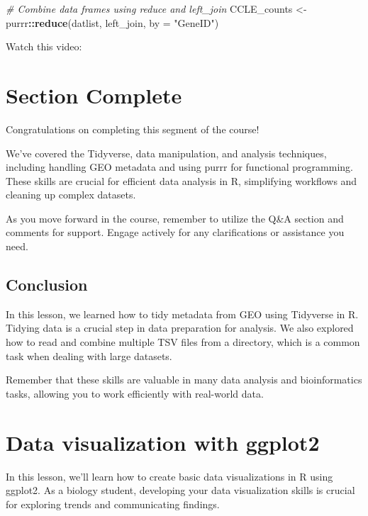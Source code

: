 \documentclass[
]{book}
\newenvironment{Shaded}{\begin{snugshade}}{\end{snugshade}}
\newcommand{\AttributeTok}[1]{\textcolor[rgb]{0.13,0.29,0.53}{#1}}
\newcommand{\CommentTok}[1]{\textcolor[rgb]{0.56,0.35,0.01}{\textit{#1}}}
\newcommand{\FunctionTok}[1]{\textcolor[rgb]{0.13,0.29,0.53}{\textbf{#1}}}
\newcommand{\NormalTok}[1]{#1}
\newcommand{\OtherTok}[1]{\textcolor[rgb]{0.56,0.35,0.01}{#1}}
\newcommand{\SpecialCharTok}[1]{\textcolor[rgb]{0.81,0.36,0.00}{\textbf{#1}}}
\newcommand{\StringTok}[1]{\textcolor[rgb]{0.31,0.60,0.02}{#1}}
\begin{document}
\begin{Shaded}
\begin{Highlighting}[]
\CommentTok{\# Combine data frames using reduce and left\_join}
\NormalTok{CCLE\_counts }\OtherTok{\textless{}{-}}\NormalTok{ purrr}\SpecialCharTok{::}\FunctionTok{reduce}\NormalTok{(datlist, left\_join, }\AttributeTok{by =} \StringTok{"GeneID"}\NormalTok{)}
\end{Highlighting}
\end{Shaded}

Watch this video:

\hypertarget{section-complete-3}{%
\section{Section Complete}\label{section-complete-3}}

Congratulations on completing this segment of the course!

We've covered the Tidyverse, data manipulation, and analysis techniques, including handling GEO metadata and using purrr for functional programming. These skills are crucial for efficient data analysis in R, simplifying workflows and cleaning up complex datasets.

As you move forward in the course, remember to utilize the Q\&A section and comments for support. Engage actively for any clarifications or assistance you need.

\hypertarget{conclusion-21}{%
\subsection{Conclusion}\label{conclusion-21}}

In this lesson, we learned how to tidy metadata from GEO using Tidyverse in R. Tidying data is a crucial step in data preparation for analysis. We also explored how to read and combine multiple TSV files from a directory, which is a common task when dealing with large datasets.

Remember that these skills are valuable in many data analysis and bioinformatics tasks, allowing you to work efficiently with real-world data.

\hypertarget{data-visualization-with-ggplot2}{%
\section{Data visualization with ggplot2}\label{data-visualization-with-ggplot2}}

In this lesson, we'll learn how to create basic data visualizations in R using ggplot2. As a biology student, developing your data visualization skills is crucial for exploring trends and communicating findings.
\end{document}
